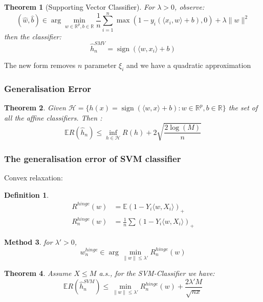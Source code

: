 \documentclass[a4paper,12pt, oneside, fleqn]{book}
\newtheorem{theorem}{Theorem}[section]
\newtheorem{method}[theorem]{Method}
\theoremstyle{definition}
\newtheorem{definition}{Definition}[section]
\theoremstyle{remark}
\DeclareMathOperator*{\sign}{sign}
\begin{document}
\begin{theorem}[Supporting Vector Classifier]
	For $\lambda > 0$, observe:
	\begin{equation*}
		(\hat{w}, \hat{b}) \in  \arg \min_{w \in \mathbb{R}^p, b \in \mathbb{R}} \frac{1}{n} \sum_{i =1}^n \max (1 - y_i(\langle x_i, w\rangle + b), 0) + \lambda \| w\|^2
	\end{equation*}
	then the classifier:
	\begin{equation}
		\hat{h}_n^{SMV} = \sign(\langle w, x_i \rangle + b)
	\end{equation}
\end{theorem}
The new form removes $n$ parameter $\xi_i$ and we have a quadratic approximation


\subsubsection*{Generalisation Error}
\begin{theorem}
	Given $\mathcal{H} = \{h(x) = \sign( \langle w, x \rangle + b) : w \in \mathbb{R}^p, b \in \mathbb{R} \}$ the set of all the affine classifiers. Then :
	\begin{equation*}
		\mathbb{E} R(\hat{h}_n) \leq \inf_{h \in \mathcal{H}} R(h) + 2 \sqrt{\frac{2 \log(M)}{n}}
	\end{equation*}
\end{theorem}



\subsubsection*{The generalisation error of SVM classifier}

Convex relaxation:
\begin{definition}
\begin{align*}
	R^{hinge} (w) &= \mathbb{E}  (1 - Y_i \langle w, X_i \rangle)_+\\
	R^{hinge}_n (w) &= \frac{1}{n} \sum (1 - Y_i \langle w, X_i \rangle)_+
\end{align*}
\end{definition}

\begin{method}
	for $\lambda' > 0$, 
	\begin{equation*}
		w^{hinge}_n \in \arg \min_{\|w\| \leq \lambda'} R_n^{hinge}(w)
	\end{equation*}
\end{method}

\begin{theorem}
	Assume $X \leq M$ a.s., for the SVM-Classifier we have:
	\begin{equation*}
		\mathbb{E}R(\hat{h}_n^{SVM}) \leq \min_{\|w \| \leq \lambda'} R^{hinge}_n(w) + \frac{2 \lambda' M}{\sqrt{nx}}
	\end{equation*}
\end{theorem}
\end{document}
